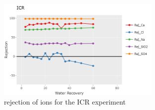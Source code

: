 \begin{figure}[H]
    \centering
    \includegraphics[width=0.7\textwidth]{Billeder/data/multi_salt/ICR_1_rejection.png}
    \caption{rejection of ions for the ICR experiment}
    \label{fig:my_ICR_rejection}
\end{figure}



















